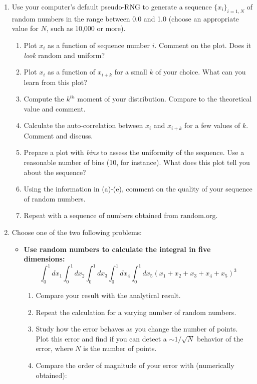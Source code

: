 \documentclass{report}
\begin{document}
\begin{enumerate}
\item Use your computer's default pseudo-RNG to
  generate a sequence $\{x_i\}_{i=1,N}$ of random numbers in the range between 0.0 and 1.0 (choose an
  appropriate value for $N$, such as 10,000 or more).
\begin{enumerate}
\item Plot $x_i$ as a function of sequence number $i$. Comment on the
  plot. Does it \textit{look} random and uniform?
\item Plot $x_i$ as a function of $x_{i+k}$ for a small $k$ of your choice. What can you learn from this plot?
\item Compute the $k^{th}$ moment of your distribution. Compare to the theoretical value and comment.
\item Calculate the auto-correlation between $x_i$ and $x_{i+k}$ for a few values of $k$. Comment and discuss.
\item Prepare a plot with \textit{bins} to assess the uniformity of the sequence. Use a reasonable number of bins (10, for instance). What does this plot tell you about the sequence?
\item Using the information in (a)-(e), comment on the quality of your sequence of random numbers.
\item Repeat with a sequence of numbers obtained from random.org.
\end{enumerate} 
\item Choose one of the two following problems:
\begin{itemize}
\item \textbf{Use random numbers to calculate the integral in five dimensions:}
\begin{equation}
\int_0^1 dx_1 \int_0^1 dx_2 \int_0^1 dx_3 \int_0^1 dx_4 \int_0^1 dx_5  (x_1+x_2+x_3+x_4+x_5)^3
\end{equation}
\begin{enumerate}
\item Compare your result with the analytical result.
\item Repeat the calculation for a varying number of random numbers. 
\item Study how the error behaves as you change the number of
  points. Plot this error and find if you can detect a $\sim
  1/\sqrt{N}$ behavior of the error, where $N$ is the number of points.
\item Compare the order of magnitude of your error with (numerically obtained):
\begin{equation}

\end{equation}
\end{enumerate}
\end{itemize}
\end{enumerate}
\end{document}
